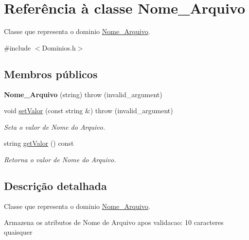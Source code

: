 \hypertarget{class_nome___arquivo}{
\section{\-Referência à classe \-Nome\-\_\-\-Arquivo}
\label{class_nome___arquivo}
}


\-Classe que representa o dominio \hyperlink{class_nome___arquivo}{\-Nome\-\_\-\-Arquivo}.  




{\ttfamily \#include $<$\-Dominios.\-h$>$}

\subsection*{\-Membros públicos}
\begin{DoxyCompactItemize}
\item 
\hypertarget{class_nome___arquivo_a94184c5ebb4b36edd83f95258fa1a816}{
{\bfseries \-Nome\-\_\-\-Arquivo} (string)  throw (invalid\-\_\-argument)}
\label{class_nome___arquivo_a94184c5ebb4b36edd83f95258fa1a816}

\item 
void \hyperlink{class_nome___arquivo_a93ccb1b3f4c3458075dfa949a8d86201}{set\-Valor} (const string \&)  throw (invalid\-\_\-argument)
\begin{DoxyCompactList}\small\item\em \-Seta o valor de \-Nome do \-Arquivo. \end{DoxyCompactList}\item 
string \hyperlink{class_nome___arquivo_a265da0a7dc6a42300a7955bba9f6fcfa}{get\-Valor} () const 
\begin{DoxyCompactList}\small\item\em \-Retorna o valor de \-Nome do \-Arquivo. \end{DoxyCompactList}\end{DoxyCompactItemize}


\subsection{\-Descrição detalhada}
\-Classe que representa o dominio \hyperlink{class_nome___arquivo}{\-Nome\-\_\-\-Arquivo}. 

\-Armazena os atributos de \-Nome de \-Arquivo apos validacao\-: 10 caracteres quaisquer 

